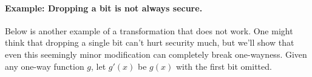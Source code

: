 

\paragraph{Example: Dropping a bit is not always secure.}
Below is another example of a transformation that does not work. One might think that dropping a single bit can't hurt security much, but we'll show that even this seemingly minor modification can completely break one-wayness. Given any one-way function $g$, let $g'(x)$ be $g(x)$ with the first bit omitted.

